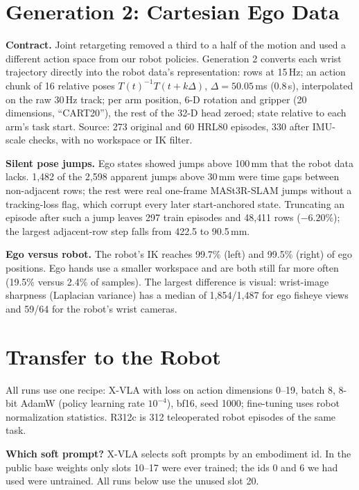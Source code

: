 \documentclass[conference,10pt]{IEEEtran}
\newcommand{\mm}{\,mm\xspace}
\begin{document}
\section{Generation 2: Cartesian Ego Data}\label{sec:gen2}
\textbf{Contract.} Joint retargeting removed a third to a half of the motion and used a different action space from our robot
policies. Generation 2 converts each wrist trajectory directly into the robot data's representation: rows at 15\,Hz; an action
chunk of 16 relative poses $T(t)^{-1}T(t+k\Delta)$, $\Delta=50.05$\,ms (0.8\,s), interpolated on the raw 30\,Hz track; per arm
position, 6-D rotation and gripper (20 dimensions, ``CART20''), the rest of the 32-D head zeroed; state relative to each arm's
task start. Source: 273 original and 60 HRL80 episodes, 330 after IMU-scale checks, with no workspace or IK filter.

\textbf{Silent pose jumps.} Ego states showed jumps above 100\mm that the robot data lacks. 1{,}482 of the 2{,}598 apparent jumps
above 30\mm were time gaps between non-adjacent rows; the rest were real one-frame MASt3R-SLAM jumps without a tracking-loss
flag, which corrupt every later start-anchored state. Truncating an episode after such a jump leaves 297 train episodes and
48{,}411 rows ($-6.20$\%); the largest adjacent-row step falls from 422.5 to 90.5\mm.

\textbf{Ego versus robot.} The robot's IK reaches 99.7\% (left) and 99.5\% (right) of ego positions. Ego hands use a smaller
workspace and are both still far more often (19.5\% versus 2.4\% of samples). The largest difference is visual: wrist-image
sharpness (Laplacian variance) has a median of 1{,}854/1{,}487 for ego fisheye views and 59/64 for the robot's wrist cameras.

\section{Transfer to the Robot}\label{sec:transfer}
All runs use one recipe: X-VLA with loss on action dimensions 0--19, batch 8, 8-bit AdamW (policy learning rate $10^{-4}$), bf16,
seed 1000; fine-tuning uses robot normalization statistics. R312c is 312 teleoperated robot episodes of the same task.

\textbf{Which soft prompt?} X-VLA selects soft prompts by an embodiment id. In the public base weights only slots 10--17 were ever
trained; the ids 0 and 6 we had used were untrained. All runs below use the unused slot 20.
\end{document}
